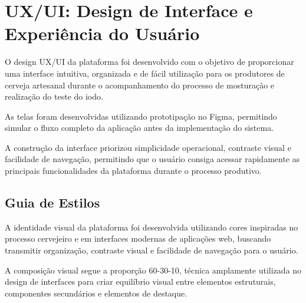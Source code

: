 \section{UX/UI: Design de Interface e Experiência do Usuário}

O design UX/UI da plataforma foi desenvolvido com o objetivo de proporcionar uma interface intuitiva, organizada e de fácil utilização para os produtores de cerveja artesanal durante o acompanhamento do processo de mosturação e realização do teste do iodo.

As telas foram desenvolvidas utilizando prototipação no Figma, permitindo simular o fluxo completo da aplicação antes da implementação do sistema.

A construção da interface priorizou simplicidade operacional, contraste visual e facilidade de navegação, permitindo que o usuário consiga acessar rapidamente as principais funcionalidades da plataforma durante o processo produtivo.

\subsection{Guia de Estilos}

A identidade visual da plataforma foi desenvolvida utilizando cores inspiradas no processo cervejeiro e em interfaces modernas de aplicações web, buscando transmitir organização, contraste visual e facilidade de navegação para o usuário.

A composição visual segue a proporção 60-30-10, técnica amplamente utilizada no design de interfaces para criar equilíbrio visual entre elementos estruturais, componentes secundários e elementos de destaque.

